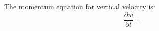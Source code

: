 \documentclass{article}
\begin{document}
  The momentum equation for vertical velocity is:  
        \begin{equation}
        \frac{\partial w}{\partial t} +
        \end{equation}
\end{document}
